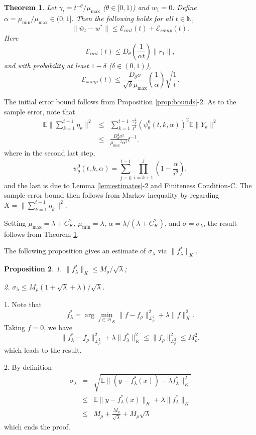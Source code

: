 \documentclass[twoside,twocolumn,journal]{IEEEtran}
\newtheorem{thm}{Theorem}[section]
\newtheorem{prop}[thm]{Proposition}
\newenvironment{pf}[1][Proof]{\medskip\noindent\hspace{1em}{\itshape #1: }}{\hspace*{\fill}~\QED\par\endtrivlist\medskip}
\def\N{{\mathbb N}}
\def\E{{\mathbb E}}        %
\def\L{{\mathscr L}}
\def\H{{\mathscr H}}
\def\Err{{\mathscr E}}
\def\amax{{\mu_{\max}}}
\def\amin{{\mu_{\min}} }
\begin{document}
\medskip

\begin{thm} \label{thm:B1}
Let $\gamma_t = t^{-\theta}/\amax$ ($\theta\in [0,1)$) and $w_1=0$. Define $\alpha=\amin/\amax \in (0,1]$.
Then the following holds for all $t\in \N$,
\[ \| \bar{w}_t -w^\ast \| \leq \Err_{init}(t) + \Err_{samp}(t). \]
Here
\[ \Err_{init}(t)\leq  D_\theta\left(\frac{1}{\alpha t} \right)\|r_1\| , \]
and with probability at least $1-\delta$ ($\delta\in (0,1)$),
\[ \Err_{samp}(t) \leq  \frac{D_\theta \sigma}{\sqrt{\delta} \amax} \left(\frac{1}{\alpha}\right) \sqrt{\frac{1}{t}}. \]
\end{thm}

\begin{pf}
The initial error bound follows from Proposition \ref{prop:bounds}-2. As to the sample error, note that
\begin{eqnarray*}
\E \|\sum_{k=1}^{t-1} \eta_k\|^2 & \leq & \sum_{k=1}^{t-1} \frac{\gamma^2_k}{t^2}  (\psi^0_\theta(t,k,\alpha))^2 \E \|Y_k\|^2 \\
& \leq & \frac{D_\theta^2 \sigma^2}{\amax^2\alpha^2}t^{-1}.
\end{eqnarray*}
where in the second last step,
\[ \psi^0_\theta(t,k,\alpha) = \sum_{j=k}^{t-1} \prod_{i=k+1}^j \left(1-\frac{\alpha}{i^\theta} \right), \]
and the last is due to Lemma \ref{lem:estimates}-2 and Finiteness Condition-C. The sample error bound then follows from Markov inequality
by regarding $X=\|\sum_{k=1}^{t-1} \eta_k\|^2$.
\end{pf}

\begin{pf}[Proof of Theorem B*]
Setting $\amax=\lambda+C^2_K$, $\amin=\lambda$, $\alpha=\lambda/(\lambda+C^2_K)$, and $\sigma=\sigma_\lambda$, the result follows from Theorem \ref{thm:B1}.
\end{pf}

The following proposition gives an estimate of $\sigma_\lambda$ via $\|f^\ast_\lambda\|_K$.

\medskip

\begin{prop} \label{prop:varbnd}
1. $ \|f^\ast_\lambda\|_K \leq M_\rho /\sqrt{\lambda}$;

2. $\sigma_\lambda \leq M_\rho(1+\sqrt{\lambda}+\lambda)/\sqrt{\lambda}$.
\end{prop}

\begin{pf}
1. Note that
\[ f^\ast_\lambda = \arg \min_{f\in \H_K} \|f - f_\rho\|_{\L^2_\rho}^2 + \lambda \|f\|^2_K. \]
Taking $f=0$, we have
\[ \|f^\ast_\lambda - f_\rho\|_{\L^2_\rho}^2 + \lambda \|f^\ast_\lambda\|^2_K \leq \|f_\rho\|_{\L^2_\rho}^2 \leq M_\rho^2, \]
which leads to the result.

2. By definition
\begin{eqnarray*}
\sigma_\lambda & = & \sqrt{\E\|(y-f^\ast_\lambda(x))-\lambda f^\ast_\lambda\|_K^2} \\
& \leq & \E \|y-f^\ast_\lambda(x)\|_K + \lambda \|f^\ast_\lambda\|_K \\
& \leq &  M_\rho+ \frac{M_\rho}{\sqrt{\lambda}} + M_\rho \sqrt{\lambda}
\end{eqnarray*}
which ends the proof.
\end{pf}
\end{document}
